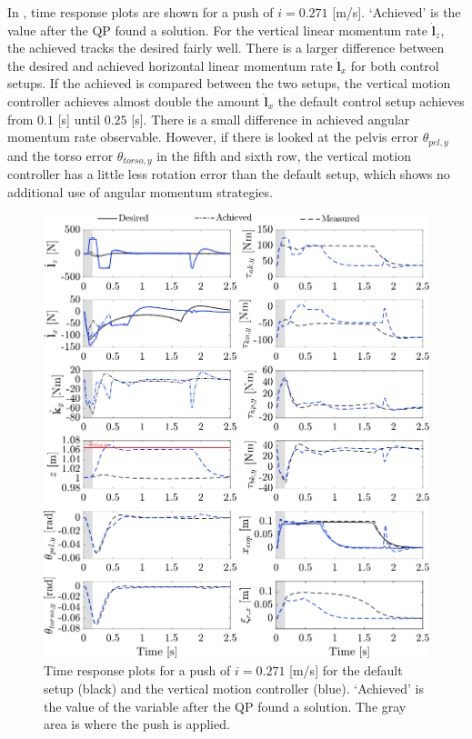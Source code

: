 In , time response plots are shown for a push of $i=0.271$ [m/s]. `Achieved' is the value after the \ac{QP} found a solution. For the vertical linear momentum rate $\dot{\mathbf{l}}_z$, the achieved tracks the desired fairly well. There is a larger difference between the desired and achieved horizontal linear momentum rate $\dot{\mathbf{l}}_x$ for both control setups. If the achieved is compared between the two setups, the vertical motion controller achieves almost double the amount $\dot{\mathbf{l}}_x$ the default control setup achieves from $0.1$ [s] until $0.25$ [s]. There is a small difference in achieved angular momentum rate observable. However, if there is looked at the pelvis error $\theta_{pel,y}$ and the torso error $\theta_{torso,y}$ in the fifth and sixth row, the vertical motion controller has a little less rotation error than the default setup, which shows no additional use of angular momentum strategies.
\begin{figure}
\centering
\includegraphics[width=1.0\textwidth]{STYLESTUFF/valcomparetime.png}
\caption{Time response plots for a push of $i=0.271$ [m/s] for the default setup (black) and the vertical motion controller (blue). `Achieved' is the value of the variable after the \ac{QP} found a solution. The gray area is where the push is applied.}
\label{fig:valcomparetime}
\end{figure}

